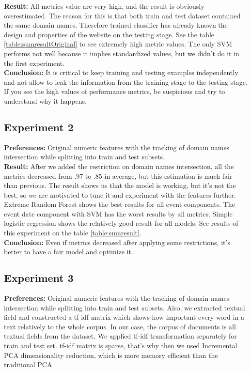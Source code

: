 \noindent\textbf{Result:} All metrics value are very high, and the result is obviously overestimated. The reason for this is that both train and test dataset contained the same domain names. Therefore trained classifier has already known the design and properties of the website on the testing stage. See the table \ref{table:sumresultOriginal} to see extremely high metric values. The only SVM performs not well because it implies standardized values, but we didn't do it in the first experiment.\\

\noindent\textbf{Conclusion:} It is critical to keep training and testing examples independently and not allow to leak the information from the training stage to the testing stage. If you see the high values of performance metrics, be suspicious and try to understand why it happens.

\subsection{Experiment 2}
\noindent\textbf{Preferences:} Original numeric features with the tracking of domain names intersection while splitting into train and test subsets. \\

\noindent\textbf{Result:} After we added the restriction on domain names intersection, all the metrics decreased from .97 to .85 in average, but this estimation is much fair than previous. The result shows us that the model is working, but it's not the best, so we are motivated to tune it and experiment with the features further. Extreme Random Forest shows the best results for all event components. The event date component with SVM has the worst results by all metrics. Simple logistic regression shows the relatively good result for all models. See results of this experiment on the table \ref{table:sumresult}.\\     

\noindent\textbf{Conclusion:} Even if metrics decreased after applying some restrictions, it's better to have a fair model and optimize it.


\subsection{Experiment 3}
\noindent\textbf{Preferences:} Original numeric features with the tracking of domain names intersection while splitting into train and test subsets. Also, we extracted textual field and constructed a tf-idf \cite{tfidf} matrix which shows how important every word in a text relatively to the whole corpus. In our case, the corpus of documents is all textual fields from the dataset. We applied tf-idf transformation separately for train and test set. tf-idf matrix is sparse, that's why then we used Incremental PCA \cite{PCA} dimensionality reduction, which is more memory efficient than the traditional PCA. \\

